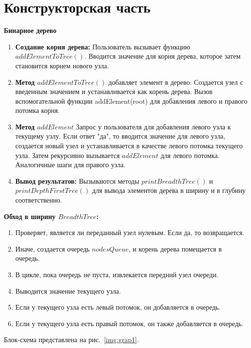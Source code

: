 \documentclass[12pt, a4paper]{article}
\begin{document}
\section{Конструкторская часть}
\textbf{Бинарное дерево}
\begin{enumerate}
	\item \textbf{Создание корня дерева:} Пользователь вызывает функцию 
	$addElementToTree()$. Вводится значение для корня дерева, которое затем 
	становится корнем нового узла.
	\item \textbf{Метод $addElementToTree()$} добавляет элемент в дерево: 
	Создается узел с введенным значением и устанавливается как корень дерева.
	Вызов вспомогательной функции addElement(root) для добавления левого и 
	правого потомка корня.
	\item \textbf{Метод $addElement$} Запрос у пользователя для добавления 
	левого узла к текущему узлу. Если ответ "да", то вводится значение для 
	левого узла, создается новый узел и устанавливается в качестве левого 
	потомка текущего узла. Затем рекурсивно вызывается $addElement$ для левого 
	потомка. Аналогичные шаги для правого узла.
	\item \textbf{Вывод результатов:} Вызываются методы $printBreadthTree()$ и 
	$printDepthFirstTree()$ для вывода элементов дерева в ширину и в глубину 
	соответственно.
\end{enumerate}
\textbf{Обход в ширину $BreadthTree$:}
\begin{enumerate}
	\item Проверяет, является ли переданный узел нулевым. Если да, то 
	возвращается.
	\item Иначе, создается очередь $nodesQueue$, и корень дерева помещается в 
	очередь.
	\item В цикле, пока очередь не пуста, извлекается передний узел очереди.
	\item Выводится значение текущего узла.
	\item Если у текущего узла есть левый потомок, он добавляется в очередь.
	\item Если у текущего узла есть правый потомок, он также добавляется в 
	очередь.
\end{enumerate} 
\newpage
Блок-схема представлена на рис.~\ref{img:grap1}.
\end{document}
